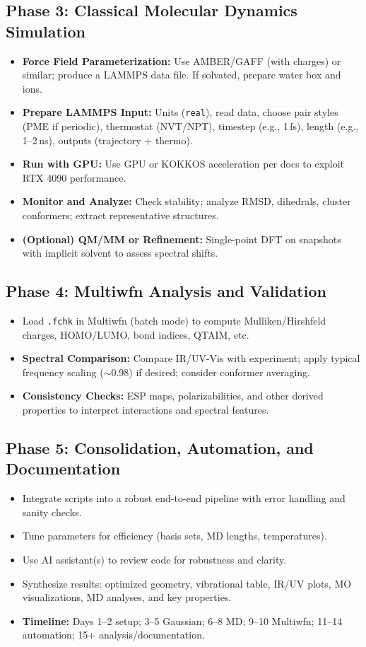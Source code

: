 \documentclass[11pt]{article}
\begin{document}
\subsection*{Phase 3: Classical Molecular Dynamics Simulation}
\begin{itemize}
  \item \textbf{Force Field Parameterization:} Use AMBER/GAFF (with charges) or similar; produce a LAMMPS data file. If solvated, prepare water box and ions.
  \item \textbf{Prepare LAMMPS Input:} Units (\texttt{real}), read data, choose pair styles (PME if periodic), thermostat (NVT/NPT), timestep (e.g., 1\,fs), length (e.g., 1--2\,ns), outputs (trajectory + thermo).
  \item \textbf{Run with GPU:} Use GPU or KOKKOS acceleration per docs to exploit RTX 4090 performance.
  \item \textbf{Monitor and Analyze:} Check stability; analyze RMSD, dihedrals, cluster conformers; extract representative structures.
  \item \textbf{(Optional) QM/MM or Refinement:} Single-point DFT on snapshots with implicit solvent to assess spectral shifts.
\end{itemize}

\subsection*{Phase 4: Multiwfn Analysis and Validation}
\begin{itemize}
  \item Load \texttt{.fchk} in Multiwfn (batch mode) to compute Mulliken/Hirshfeld charges, HOMO/LUMO, bond indices, QTAIM, etc.
  \item \textbf{Spectral Comparison:} Compare IR/UV-Vis with experiment; apply typical frequency scaling ($\sim$0.98) if desired; consider conformer averaging.
  \item \textbf{Consistency Checks:} ESP maps, polarizabilities, and other derived properties to interpret interactions and spectral features.
\end{itemize}

\subsection*{Phase 5: Consolidation, Automation, and Documentation}
\begin{itemize}
  \item Integrate scripts into a robust end-to-end pipeline with error handling and sanity checks.
  \item Tune parameters for efficiency (basis sets, MD lengths, temperatures).
  \item Use AI assistant(s) to review code for robustness and clarity.
  \item Synthesize results: optimized geometry, vibrational table, IR/UV plots, MO visualizations, MD analyses, and key properties.
  \item \textbf{Timeline:} Days 1--2 setup; 3--5 Gaussian; 6--8 MD; 9--10 Multiwfn; 11--14 automation; 15+ analysis/documentation.
\end{itemize}
\end{document}
